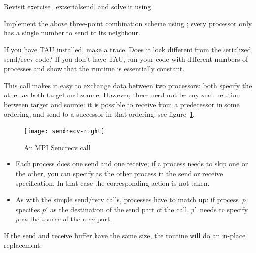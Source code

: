 \begin{exercise}
  \label{ex:rightsendrecv}
  Revisit exercise~\ref{ex:serialsend} and solve it using
\end{exercise}

\begin{exercise}
  \label{ex:3ptsendrecv}
  Implement the above three-point combination scheme using ;
  every processor only has a single number to send to its neighbour.

  If you have TAU installed, make a trace. Does it look different
  from the serialized send/recv code? If you don't have TAU, run your
  code with different numbers of processes and show that the runtime
  is essentially constant.
\end{exercise}

This call makes it easy to exchange data between two processors: both
specify the other as both target and source. However, there need not
be any such relation between target and source: it is possible to
receive from a predecessor in some ordering, and send to a successor
in that ordering; see figure~\ref{fig:sendrecv}.
\begin{figure}[ht]
  \texttt{[image: sendrecv-right]}
  \caption{An MPI Sendrecv call}
  \label{fig:sendrecv}
\end{figure}
\begin{itemize}
\item Each process does one send and one receive; if a process needs
  to skip one or the other, you can specify
   as the other process in the send or
  receive specification. In that case the corresponding action
  is not taken.
\item As with the simple send/recv calls, processes have to match up:
  if process~$p$ specifies $p'$ as the destination of the send part of
  the call, $p'$~needs to specify $p$ as the source of the recv part.
\end{itemize}

If the send and receive buffer have the same size, the routine
 will do an in-place replacement.



